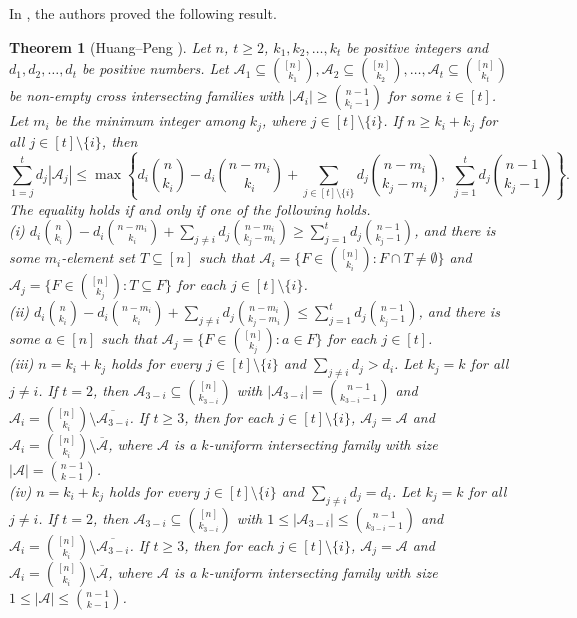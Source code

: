 \documentclass[a4paper,11pt]{article}
\newtheorem{theorem}{Theorem}[section]
\begin{document}
In \cite{HP+}, the authors proved the following result.
\begin{theorem}[Huang--Peng \cite{HP+}]\label{thm3.3}
Let $n$, $t\geq 2$, $k_1, k_2, \dots, k_t$ be positive integers and $d_1, d_2, \dots, d_t$ be positive numbers. Let
$\mathcal{A}_1\subseteq{[n]\choose k_1}, \mathcal{A}_2\subseteq{[n]\choose k_2}, \dots, \mathcal{A}_t\subseteq{[n]\choose k_t}$ be non-empty  cross intersecting families with $|\mathcal{A}_i|\geq {n-1\choose k_i-1}$ for some $i\in [t]$. Let $m_i$ be the minimum integer among $k_j$, where $j\in [t]\setminus \{i\}$. If $n\geq k_i+k_j$ for all $j\in [t]\setminus \{i\}$, then
$$\sum_{1=j}^td_j|\mathcal{A}_j|\leq \max  \left\{d_i{n\choose k_i}-d_i{n-m_i\choose k_i}+\sum_{j\in [t]\setminus \{i\}}d_j{n-m_i\choose k_j-m_i}, \,\,\sum_{j=1}^td_j{n-1\choose k_j-1}\right\}.$$
The equality holds if and only if one of the following holds.\\
(i)  $d_i{n\choose k_i}-d_i{n-m_i \choose k_i}+\sum_{j\ne i}d_j{n-m_i\choose k_j-m_i}\geq \sum_{j=1}^td_j{n-1\choose k_j-1}$, and  there is some $m_i$-element set $T\subseteq [n]$ such that $\mathcal{A}_i=\{F\in {[n]\choose k_i}: F\cap T\ne\emptyset\}$ and $\mathcal{A}_j=\{F\in {[n]\choose k_j}: T\subseteq F\}$ for each $j\in [t]\setminus \{i\}$.\\
(ii) $d_i{n\choose k_i}-d_i{n-m_i \choose k_i}+\sum_{j\ne i}d_j{n-m_i\choose k_j-m_i}\leq \sum_{j=1}^td_j{n-1\choose k_j-1}$, and
 there is some $a\in [n]$ such that $\mathcal{A}_j=\{F\in{[n]\choose k_j}: a\in F\}$ for each $j\in [t]$. \\
(iii) $n=k_i+k_j$ holds for every $j\in [t]\setminus \{i\}$ and $\sum_{j\ne i}d_j>d_i$. Let $k_j=k$ for all $j\ne i$.
If $t=2$, then $\mathcal{A}_{3-i}\subseteq {[n]\choose k_{3-i}}$ with $|\mathcal{A}_{3-i}|={n-1\choose k_{3-i}-1}$ and $\mathcal{A}_i={[n]\choose k_i}\setminus \overline{\mathcal{A}_{3-i}}$.  If $t\geq3$, then for each $j\in [t]\setminus \{i\}$, $\mathcal{A}_j=\mathcal{A}$ and $\mathcal{A}_i={[n]\choose k_i}\setminus \overline{\mathcal{A}}$, where $\mathcal{A}$ is a $k$-uniform intersecting family with size $|\mathcal{A}|= {n-1\choose k-1}$.\\
(iv) $n=k_i+k_j$ holds for every $j\in [t]\setminus \{i\}$ and $\sum_{j\ne i}d_j=d_i$. Let $k_j=k$ for all $j\ne i$.
If $t=2$, then $\mathcal{A}_{3-i}\subseteq {[n]\choose k_{3-i}}$ with $1\leq|\mathcal{A}_{3-i}|\leq{n-1\choose k_{3-i}-1}$ and $\mathcal{A}_i={[n]\choose k_i}\setminus \overline{\mathcal{A}_{3-i}}$.
If $t\geq3$, then for each $j\in [t]\setminus \{i\}$, $\mathcal{A}_j=\mathcal{A}$ and $\mathcal{A}_i={[n]\choose k_i}\setminus \overline{\mathcal{A}}$, where $\mathcal{A}$ is a $k$-uniform intersecting family with size $1\leq |\mathcal{A}|\leq {n-1\choose k-1}$.
\end{theorem}
\end{document}
